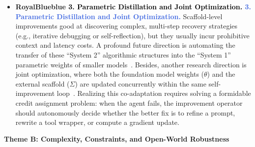 \documentclass{article}
\let\oldtextcolor\textcolor
\renewcommand{\textcolor}[2]{
  \def\temp{#1}
  \def\red{blue}
  \ifx\temp\red
    \oldtextcolor{black}{#2}
  \else
    \oldtextcolor{#1}{#2}
  \fi
}
\begin{document}
\begin{itemize}[leftmargin=*, label={}, itemsep=0.9em, topsep=0.2em]
\item \textbf{\textcolor{RoyalBlue}{3.  Parametric Distillation and Joint Optimization.}} Scaffold-level improvements good at discovering complex, multi-step recovery strategies (e.g., iterative debugging or self-reflection), but they usually incur prohibitive context and latency costs. A profound future direction is automating the transfer of these ``System 2'' algorithmic structures into the ``System 1'' parametric weights of smaller models~\citep{qiu2025alitageneralistagentenabling}. Besides, another research direction is joint optimization, where both the foundation model weights ($\theta$) and the external scaffold ($\Sigma$) are updated concurrently within the same self-improvement loop~\citep{hebbar2026sia}. Realizing this co-adaptation requires solving a formidable credit assignment problem: when the agent fails, the improvement operator should autonomously decide whether the better fix is to refine a prompt, rewrite a tool wrapper, or compute a gradient update.
\end{itemize}

\vspace{0.55em}
\noindent\textbf{Theme B: Complexity, Constraints, and Open-World Robustness}
\vspace{0.2em}
\end{document}
